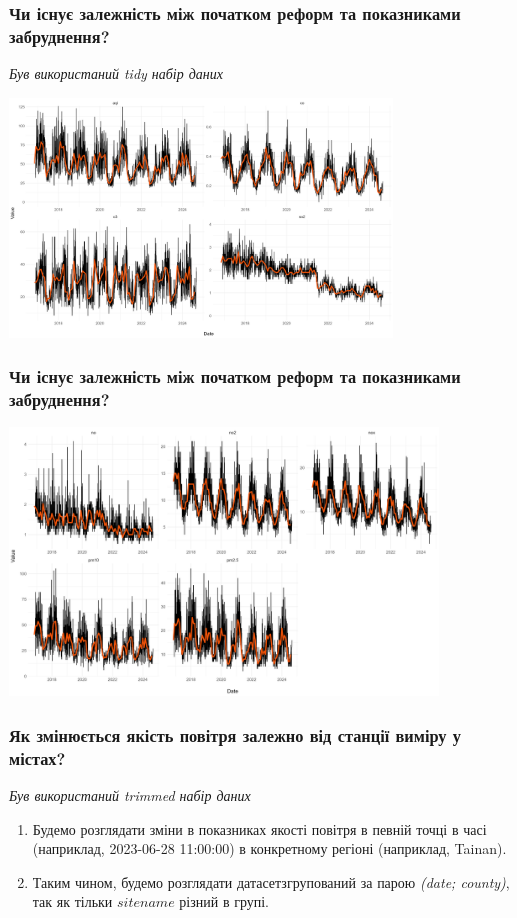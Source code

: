 \documentclass{beamer}
\begin{document}

\begin{frame}
  \frametitle{Чи існує залежність між початком реформ та показниками забруднення?}

  \textit{Був використаний tidy набір даних}

  \begin{center}
    \includegraphics[height=2.5in]{plots/question6/line-p1.png}
  \end{center}
\end{frame}

\begin{frame}
  \frametitle{Чи існує залежність між початком реформ та показниками забруднення?}

  \begin{center}
    \includegraphics[height=2.8in]{plots/question6/line-p2.png}
  \end{center}
\end{frame}


\begin{frame}
  \frametitle{Як змінюється якість повітря залежно від станції виміру у містах?}

  \textit{Був використаний trimmed набір даних}

  \begin{enumerate}
    \item Будемо розглядати зміни в показниках якості повітря в певній точці в часі (наприклад, 2023-06-28 11:00:00) в
    конкретному регіоні (наприклад, Tainan).
    \item Таким чином, будемо розглядати датасетзгрупований за парою \textit{(date; county)}, так як тільки $sitename$ різний в групі.
  \end{enumerate}
\end{frame}
\end{document}
